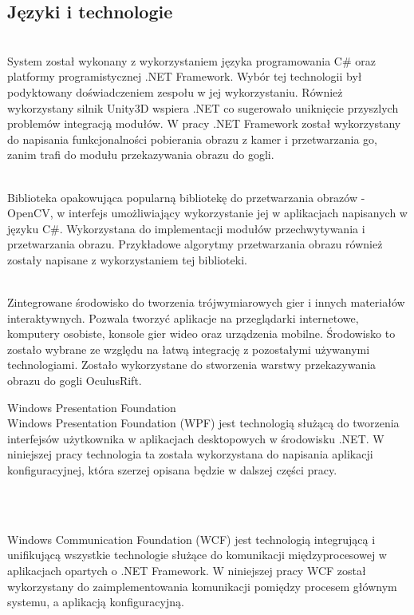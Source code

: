 \documentclass[a4paper,11pt,twoside]{report}
\theoremstyle{definition}
\begin{document}
\subsection {Języki i technologie }

\begin{description}
\item [Język programowania C\# ] \hfill \\
System został wykonany z wykorzystaniem języka programowania C\# oraz platformy programistycznej .NET Framework. Wybór tej technologii był podyktowany doświadczeniem zespołu w jej wykorzystaniu. Również wykorzystany silnik Unity3D wspiera .NET co sugerowało uniknięcie przyszlych problemów integracją modułów. W pracy .NET Framework został wykorzystany do napisania funkcjonalności pobierania obrazu z kamer i przetwarzania go, zanim trafi do modułu przekazywania obrazu do gogli.

\item [EmguCV] \hfill \\
Biblioteka opakowująca popularną bibliotekę do przetwarzania obrazów - OpenCV, w interfejs umożliwiający wykorzystanie jej w aplikacjach napisanych w języku C\#. Wykorzystana do implementacji modułów przechwytywania i przetwarzania obrazu. Przykładowe algorytmy przetwarzania obrazu również zostały napisane z wykorzystaniem tej biblioteki.

\item [Silnik Unity3D] \hfill \\
Zintegrowane środowisko do tworzenia trójwymiarowych gier i innych materiałów interaktywnych.  Pozwala tworzyć aplikacje na przeglądarki internetowe, komputery osobiste, konsole gier wideo oraz urządzenia mobilne. Środowisko to zostało wybrane ze względu na łatwą integrację z pozostałymi używanymi technologiami. Zostało wykorzystane do stworzenia warstwy przekazywania obrazu do gogli OculusRift.

\begin{minipage}{\linewidth}
\item [Windows Presentation Foundation] \hfill \\
Windows Presentation Foundation (WPF) jest technologią służącą do tworzenia interfejsów użytkownika w aplikacjach desktopowych w środowisku .NET. W niniejszej pracy technologia ta została wykorzystana do napisania aplikacji konfiguracyjnej, która szerzej opisana będzie w dalszej części pracy.
\end{minipage}\\

\item [Windows Communication Foundation] \hfill \\
Windows Communication Foundation (WCF) jest technologią integrującą i unifikującą wszystkie technologie służące do komunikacji międzyprocesowej w aplikacjach opartych o .NET Framework. W niniejszej pracy WCF został wykorzystany do zaimplementowania komunikacji pomiędzy procesem głównym systemu, a aplikacją konfiguracyjną.
\end{description}
\end{document}
